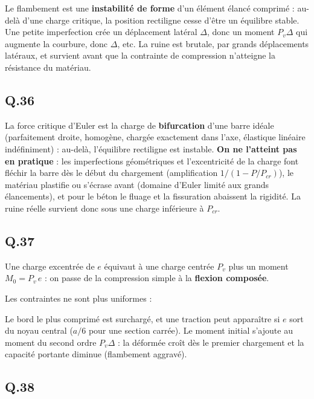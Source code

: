 \documentclass[11pt,a4paper]{article}
\newcommand{\equationajustee}[1]{%
  \sbox{\boiteequation}{$\displaystyle #1$}%
  \ifdim\wd\boiteequation>\linewidth
    \[\resizebox{\linewidth}{!}{\usebox{\boiteequation}}\]%
  \else
    \[#1\]%
  \fi}
\begin{document}
Le flambement est une \textbf{instabilité de forme} d'un élément élancé comprimé : au-delà d'une charge critique, la position rectiligne cesse d'être un équilibre stable. Une petite imperfection crée un déplacement latéral \(\Delta\), donc un moment \(P_v\Delta\) qui augmente la courbure, donc \(\Delta\), etc. La ruine est brutale, par grands déplacements latéraux, et survient avant que la contrainte de compression n'atteigne la résistance du matériau.

\hypertarget{q.36}{%
\subsection{Q.36}\label{q.36}}

La force critique d'Euler est la charge de \textbf{bifurcation} d'une barre idéale (parfaitement droite, homogène, chargée exactement dans l'axe, élastique linéaire indéfiniment) : au-delà, l'équilibre rectiligne est instable. \textbf{On ne l'atteint pas en pratique} : les imperfections géométriques et l'excentricité de la charge font fléchir la barre dès le début du chargement (amplification \(1/(1-P/P_{cr})\)), le matériau plastifie ou s'écrase avant (domaine d'Euler limité aux grands élancements), et pour le béton le fluage et la fissuration abaissent la rigidité. La ruine réelle survient donc sous une charge inférieure à \(P_{cr}\).

\hypertarget{q.37}{%
\subsection{Q.37}\label{q.37}}

Une charge excentrée de \(e\) équivaut à une charge centrée \(P_v\) plus un moment \(M_0=P_v\,e\) : on passe de la compression simple à la \textbf{flexion composée}.

Les contraintes ne sont plus uniformes :

\equationajustee{\sigma=\frac{P_v}{S}\pm\frac{M_0\,v}{I}}

Le bord le plus comprimé est surchargé, et une traction peut apparaître si \(e\) sort du noyau central (\(a/6\) pour une section carrée). Le moment initial s'ajoute au moment du second ordre \(P_v\Delta\) : la déformée croît dès le premier chargement et la capacité portante diminue (flambement aggravé).

\hypertarget{q.38}{%
\subsection{Q.38}\label{q.38}}
\end{document}
